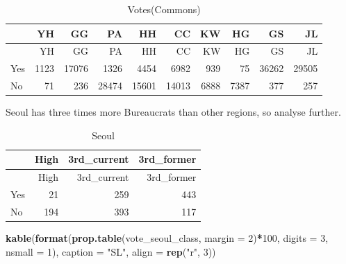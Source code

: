 \documentclass[
]{article}
\newenvironment{Shaded}{\begin{snugshade}}{\end{snugshade}}
\newcommand{\DataTypeTok}[1]{\textcolor[rgb]{0.13,0.29,0.53}{#1}}
\newcommand{\DecValTok}[1]{\textcolor[rgb]{0.00,0.00,0.81}{#1}}
\newcommand{\KeywordTok}[1]{\textcolor[rgb]{0.13,0.29,0.53}{\textbf{#1}}}
\newcommand{\NormalTok}[1]{#1}
\newcommand{\OperatorTok}[1]{\textcolor[rgb]{0.81,0.36,0.00}{\textbf{#1}}}
\newcommand{\OtherTok}[1]{\textcolor[rgb]{0.56,0.35,0.01}{#1}}
\newcommand{\StringTok}[1]{\textcolor[rgb]{0.31,0.60,0.02}{#1}}
\begin{document}
\begin{longtable}[]{@{}lrrrrrrrrr@{}}
\caption{Votes(Commons)}\tabularnewline
\toprule
& YH & GG & PA & HH & CC & KW & HG & GS & JL\tabularnewline
\midrule
\endfirsthead
\toprule
& YH & GG & PA & HH & CC & KW & HG & GS & JL\tabularnewline
\midrule
\endhead
Yes & 1123 & 17076 & 1326 & 4454 & 6982 & 939 & 75 & 36262 &
29505\tabularnewline
No & 71 & 236 & 28474 & 15601 & 14013 & 6888 & 7387 & 377 &
257\tabularnewline
\bottomrule
\end{longtable}

Seoul has three times more Bureaucrats than other regions, so analyse
further.

\begin{Shaded}
\end{Shaded}

\begin{longtable}[]{@{}lrrr@{}}
\caption{Seoul}\tabularnewline
\toprule
& High & 3rd\_current & 3rd\_former\tabularnewline
\midrule
\endfirsthead
\toprule
& High & 3rd\_current & 3rd\_former\tabularnewline
\midrule
\endhead
Yes & 21 & 259 & 443\tabularnewline
No & 194 & 393 & 117\tabularnewline
\bottomrule
\end{longtable}

\begin{Shaded}
\begin{Highlighting}[]
\KeywordTok{kable}\NormalTok{(}\KeywordTok{format}\NormalTok{(}\KeywordTok{prop.table}\NormalTok{(vote\_seoul\_class, }\DataTypeTok{margin =} \DecValTok{2}\NormalTok{)}\OperatorTok{*}\DecValTok{100}\NormalTok{, }\DataTypeTok{digits  =} \DecValTok{3}\NormalTok{, }\DataTypeTok{nsmall =} \DecValTok{1}\NormalTok{), }\DataTypeTok{caption =} \StringTok{"SL"}\NormalTok{, }\DataTypeTok{align =} \KeywordTok{rep}\NormalTok{(}\StringTok{"r"}\NormalTok{, }\DecValTok{3}\NormalTok{))}
\end{Highlighting}
\end{Shaded}
\end{document}
